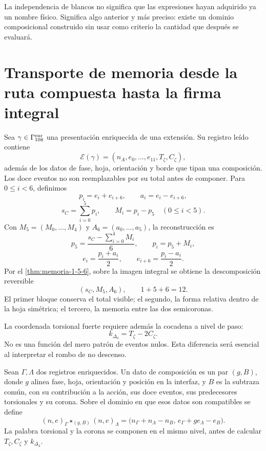 La independencia de blancos no significa que las expresiones hayan adquirido
ya un nombre físico. Significa algo anterior y más preciso: existe un dominio
composicional construido sin usar como criterio la cantidad que después se
evaluará.

\section{Transporte de memoria desde la ruta compuesta hasta la firma integral}
\label{sec:memoria-composicion-especies-rev6}

Sea \(\gamma\in\Gamma_{108}^{\rm enr}\) una presentación enriquecida de una
extensión. Su registro leído contiene
\[
 \mathcal E(\gamma)
 =
 (n_A,e_0,\ldots,e_{11},T_\zeta,C_\zeta),
\]
además de los datos de fase, hoja, orientación y borde que tipan una composición.
Los doce eventos no son reemplazables por su total antes de componer. Para
\(0\le i<6\), definimos
\[
 p_i=e_i+e_{i+6},
 \qquad
 a_i=e_i-e_{i+6},
\]
\[
 s_C=\sum_{i=0}^{5}p_i,
 \qquad
 M_i=p_i-p_5\quad(0\le i<5).
\]
Con \(M_5=(M_0,\ldots,M_4)\) y
\(A_6=(a_0,\ldots,a_5)\), la reconstrucción es
\[
 p_5=\frac{s_C-\sum_{i=0}^{4}M_i}{6},
 \qquad
 p_i=p_5+M_i,
\]
\[
 e_i=\frac{p_i+a_i}{2},
 \qquad
 e_{i+6}=\frac{p_i-a_i}{2}.
\]
Por el \cref{thm:memoria-1-5-6}, sobre la imagen integral se obtiene la
descomposición reversible
\[
 \boxed{(s_C,M_5,A_6),\qquad 1+5+6=12.}
\]
El primer bloque conserva el total visible; el segundo, la forma relativa
dentro de la hoja simétrica; el tercero, la memoria entre las dos semicoronas.

La coordenada torsional fuerte requiere además la cocadena a nivel de paso:
\[
 k_{\Delta_4}=T_\zeta-2C_\zeta.
\]
No es una función del mero patrón de eventos nulos. Esta diferencia será
esencial al interpretar el rombo de no descenso.

\begin{definition}
\label{def:dato-empalme-orientado-rev6}
Sean \(\Gamma,\Lambda\) dos registros enriquecidos. Un dato de composición es un
par \((g,B)\), donde \(g\) alinea fase, hoja, orientación y posición en la
interfaz, y \(B\) es la subtraza común, con su contribución a la acción, sus
doce eventos, sus predecesores torsionales y su corona. Sobre el dominio en
que esos datos son compatibles se define
\[
 \boxed{
 {(n,e)}_\Gamma\star_{(g,B)}{(n,e)}_\Lambda
 =
 \bigl(
 n_\Gamma+n_\Lambda-n_B,\,
 e_\Gamma+g e_\Lambda-e_B
 \bigr).}
\]
La palabra torsional y la corona se componen en el mismo nivel, antes de
calcular \(T_\zeta,C_\zeta\) y \(k_{\Delta_4}\).
\end{definition}

